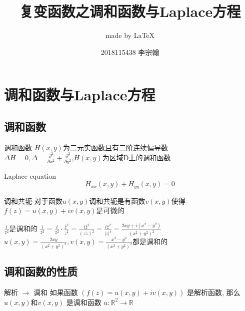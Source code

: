 \documentclass[cn,11pt,chinese,black]{elegantbook}
\title{复变函数之调和函数与Laplace方程}
\subtitle{made by \LaTeX{} }
\author{2018115438 李宗翰}
\institute{西南交大数学学院}
\begin{document}
\maketitle
\chapter{调和函数与Laplace方程}
\section{调和函数}
\begin{definition}{调和函数}
\noindent$H(x,y)$为二元实函数且有二阶连续偏导数 \\
$\Delta H=0,\Delta=\frac{\partial^{2}}{\partial x^{2}}+\frac{\partial^{2}}{\partial y^{2}}$,$H(x,y)$为区域D上的调和函数
\end{definition}
\begin{definition}{Laplace equation}
$$H_{x x}(x, y)+H_{y y}(x, y)=0$$
\end{definition}
\begin{definition}{调和共轭} 
对于函数$u(x, y)$调和共轭是有函数$v(x, y)$使得$f(z)=u(x, y)+i v(x, y)$是可微的
\end{definition}
\begin{example}
$\frac{i}{z^{2}}$是调和的
$\frac{i}{z^{2}}=\frac{i}{z^{2}} \cdot \frac{\bar{z}^{2}}{\bar{z}^{2}}=\frac{i \bar{z}^{2}}{(z \bar{z})^{2}}=\frac{i \bar{z}^{2}}{|z|^{4}}=\frac{2 x y+i\left(x^{2}-y^{2}\right)}{\left(x^{2}+y^{2}\right)^{2}}$\\
$u(x, y)=\frac{2 x y}{\left(x^{2}+y^{2}\right)^{2}},v(x, y)=\frac{x^{2}-y^{2}}{\left(x^{2}+y^{2}\right)^{2}}$都是调和的
\end{example}
\section{调和函数的性质}

\begin{theorem}{解析 $\rightarrow$ 调和}
\noindent 如果函数 $(f(z)=u(x, y)+i v(x, y))$ 是解析函数, 那么 $u(x, y)$和$v(x, y)$ 是调和函数
$u: \mathbb{R}^{2} \rightarrow \mathbb{R}$
\end{theorem}
\end{document}
